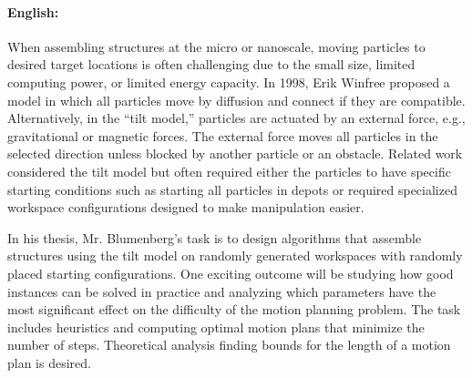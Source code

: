 \documentclass[11pt,a4paper,twoside,titlepage]{scrbook}
\theoremstyle{definition}
\begin{document}
\paragraph{English:}
When assembling structures at the micro or nanoscale, moving particles to desired target locations is often challenging due to the small size, limited computing power, or limited energy capacity. In 1998, Erik Winfree proposed a model in which all particles move by diffusion and connect if they are compatible. Alternatively, in the “tilt model,” particles are actuated by an external force, e.g., gravitational or magnetic forces. The external force moves all particles in the selected direction unless blocked by another particle or an obstacle. Related work considered the tilt model but often required either the particles to have specific starting conditions such as starting all particles in depots or required specialized workspace configurations designed to make manipulation easier.

In his thesis, Mr. Blumenberg’s task is to design algorithms that assemble structures using the tilt model on randomly generated workspaces with randomly placed starting configurations. One exciting outcome will be studying how good instances can be solved in practice and analyzing which parameters have the most significant effect on the difficulty of the motion planning problem. The task includes heuristics and computing optimal motion plans that minimize the number of steps. Theoretical analysis finding bounds for the length of a motion plan is desired.
	
	
	
	
	\tableofcontents
	
	\listoffigures
	
	
	\mainmatter
	
		
	
	
	
	
	
	
	
\end{document}
